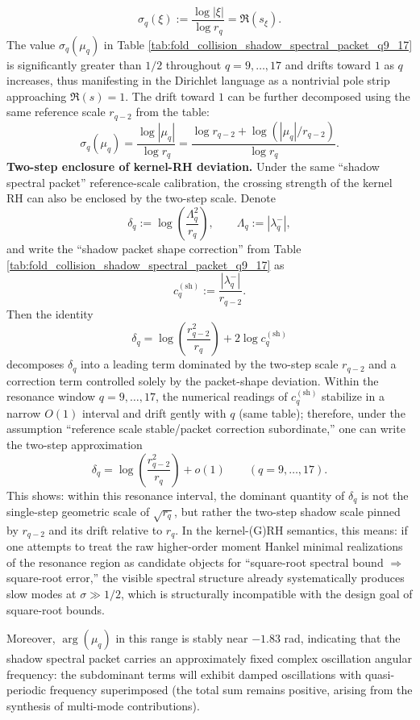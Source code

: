 \begin{remark}
\[
\sigma_q(\xi):=\frac{\log|\xi|}{\log r_q}=\Re(s_\xi).
\]
The value \(\sigma_q(\mu_q)\) in Table \ref{tab:fold_collision_shadow_spectral_packet_q9_17} is significantly greater than \(1/2\) throughout \(q=9,\dots,17\) and drifts toward \(1\) as \(q\) increases, thus manifesting in the Dirichlet language as a nontrivial pole strip approaching \(\Re(s)=1\).
The drift toward \(1\) can be further decomposed using the same reference scale \(r_{q-2}\) from the table:
\[
\sigma_q(\mu_q)=\frac{\log|\mu_q|}{\log r_q}
=\frac{\log r_{q-2}+\log(|\mu_q|/r_{q-2})}{\log r_q}.
\]
\textbf{Two-step enclosure of kernel-RH deviation.}
Under the same ``shadow spectral packet'' reference-scale calibration, the crossing strength of the kernel RH can also be enclosed by the two-step scale.
Denote
\[
\delta_q:=\log\!\left(\frac{\Lambda_q^2}{r_q}\right),
\qquad
\Lambda_q:=|\lambda_q^-|,
\]
and write the ``shadow packet shape correction'' from Table \ref{tab:fold_collision_shadow_spectral_packet_q9_17} as
\[
c_q^{(\mathrm{sh})}:=\frac{|\lambda_q^-|}{r_{q-2}}.
\]
Then the identity
\[
\delta_q
=\log\!\left(\frac{r_{q-2}^2}{r_q}\right)+2\log c_q^{(\mathrm{sh})}
\]
decomposes \(\delta_q\) into a leading term dominated by the two-step scale \(r_{q-2}\) and a correction term controlled solely by the packet-shape deviation.
Within the resonance window \(q=9,\dots,17\), the numerical readings of \(c_q^{(\mathrm{sh})}\) stabilize in a narrow \(O(1)\) interval and drift gently with \(q\) (same table); therefore, under the assumption ``reference scale stable/packet correction subordinate,'' one can write the two-step approximation
\[
\delta_q=\log\!\left(\frac{r_{q-2}^2}{r_q}\right)+o(1)
\qquad(q=9,\dots,17).
\]
This shows: within this resonance interval, the dominant quantity of \(\delta_q\) is not the single-step geometric scale of \(\sqrt{r_q}\), but rather the two-step shadow scale pinned by \(r_{q-2}\) and its drift relative to \(r_q\).
In the kernel-(G)RH semantics, this means: if one attempts to treat the raw higher-order moment Hankel minimal realizations of the resonance region as candidate objects for ``square-root spectral bound \(\Rightarrow\) square-root error,'' the visible spectral structure already systematically produces slow modes at \(\sigma\gg 1/2\), which is structurally incompatible with the design goal of square-root bounds.
\par
Moreover, \(\arg(\mu_q)\) in this range is stably near \(-1.83\) rad, indicating that the shadow spectral packet carries an approximately fixed complex oscillation angular frequency: the subdominant terms will exhibit damped oscillations with quasi-periodic frequency superimposed (the total sum remains positive, arising from the synthesis of multi-mode contributions).
\par

\end{remark}
